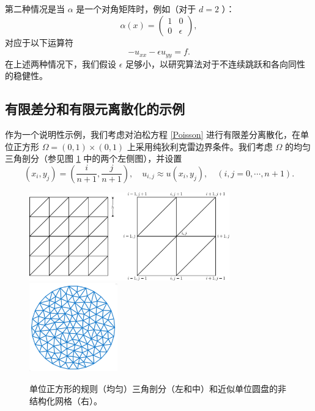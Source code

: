 \documentclass[12pt]{acta_2011xz}
\begin{document}
第二种情况是当    $\alpha$    是一个对角矩阵时，例如（对于
   $d=2$    ）：
   \begin{equation}
  \label{aniso-a}
\alpha(x)=
\begin{pmatrix}
  1 &0 \\ 
0 &\epsilon
\end{pmatrix},
\end{equation}    对应于以下运算符
   \begin{equation}\label{eq:anisotropic}
        -u_{xx}-\epsilon u_{yy} = f.
\end{equation}    在上述两种情况下，我们假设    $\epsilon$    足够小，以研究算法对于不连续跳跃和各向同性的稳健性。  

   \subsection{有限差分和有限元离散化的示例  }       \label{sec:fem}    作为一个说明性示例，我们考虑对泊松方程    \eqref{Poisson}    进行有限差分离散化，在单位正方形    $\Omega = (0,1)
\times (0,1)$    上采用纯狄利克雷边界条件。我们考虑    $\Omega$    的均匀三角剖分（参见图    \ref{fig:2dpartition}    中的两个左侧图），并设置
   \[
(x_i, y_j)=\left(\frac{i}{n+1},\frac{j}{n+1}\right),\quad u_{i,j}
\approx u(x_i,y_j), \quad (i, j=0,\cdots,n+1).
\]    
   \begin{figure}[H]
\begin{center}
\includegraphics[height=1.5in]{figures/556uniform-grid}\hfill   
\includegraphics[height=1.5in]{figures/2ddiskpartition}
\caption{单位正方形的规则（均匀）三角剖分（左和中）和近似单位圆盘的非结构化网格（右）。   \label{fig:2dpartition}     }
\end{center}
\end{figure}     
\end{document}
